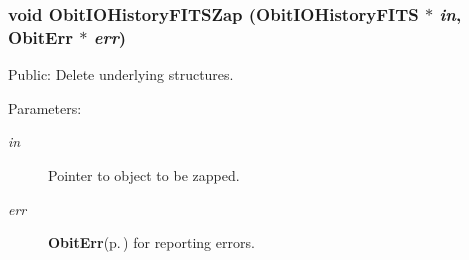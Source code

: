 \subsubsection{\setlength{\rightskip}{0pt plus 5cm}void Obit\-IOHistory\-FITSZap ({\bf Obit\-IOHistory\-FITS} $\ast$ {\em in}, {\bf Obit\-Err} $\ast$ {\em err})}\label{ObitIOHistoryFITS_8c_a10}


Public: Delete underlying structures. 

\begin{Desc}
\item[Parameters:]
\begin{description}
\item[{\em in}]Pointer to object to be zapped. \item[{\em err}]{\bf Obit\-Err}{\rm (p.\,\pageref{structObitErr})} for reporting errors. \end{description}
\end{Desc}
